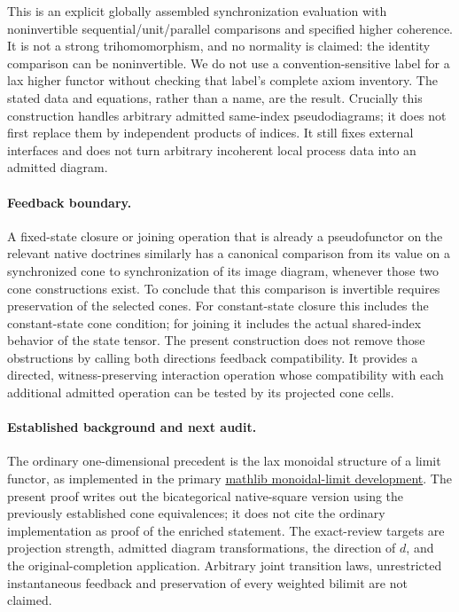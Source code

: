 \documentclass{article}
\begin{document}
This is an explicit globally assembled synchronization evaluation with noninvertible sequential/unit/parallel comparisons and specified higher coherence. It is not a strong trihomomorphism, and no normality is claimed: the identity comparison can be noninvertible. We do not use a convention-sensitive label for a lax higher functor without checking that label's complete axiom inventory. The stated data and equations, rather than a name, are the result. Crucially this construction handles arbitrary admitted same-index pseudodiagrams; it does not first replace them by independent products of indices. It still fixes external interfaces and does not turn arbitrary incoherent local process data into an admitted diagram.

\paragraph{Feedback boundary.} A fixed-state closure or joining operation that is already a pseudofunctor on the relevant native doctrines similarly has a canonical comparison from its value on a synchronized cone to synchronization of its image diagram, whenever those two cone constructions exist. To conclude that this comparison is invertible requires preservation of the selected cones. For constant-state closure this includes the constant-state cone condition; for joining it includes the actual shared-index behavior of the state tensor. The present construction does not remove those obstructions by calling both directions feedback compatibility. It provides a directed, witness-preserving interaction operation whose compatibility with each additional admitted operation can be tested by its projected cone cells.

\paragraph{Established background and next audit.} The ordinary one-dimensional precedent is the lax monoidal structure of a limit functor, as implemented in the primary \href{https://leanprover.github.io/hex/docs/Mathlib/CategoryTheory/Monoidal/Limits/Basic.html}{mathlib monoidal-limit development}. The present proof writes out the bicategorical native-square version using the previously established cone equivalences; it does not cite the ordinary implementation as proof of the enriched statement. The exact-review targets are projection strength, admitted diagram transformations, the direction of $d$, and the original-completion application. Arbitrary joint transition laws, unrestricted instantaneous feedback and preservation of every weighted bilimit are not claimed.
\end{document}
